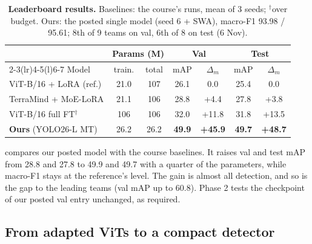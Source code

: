 \begin{table}[t]
  \centering
  \footnotesize
  \setlength{\tabcolsep}{3.4pt}
  \begin{tabular}{@{}lcccccc@{}}
    \toprule
    & \multicolumn{2}{c}{Params (M)} & \multicolumn{2}{c}{Val} & \multicolumn{2}{c}{Test} \\
    \cmidrule(lr){2-3}\cmidrule(lr){4-5}\cmidrule(l){6-7}
    Model & train. & total & mAP & $\Delta_m$ & mAP & $\Delta_m$ \\
    \midrule
    ViT-B/16 + LoRA (ref.)        & 21.0 & 107 & 26.1 & 0.0   & 25.4 & 0.0 \\
    TerraMind + MoE-LoRA          & 21.1 & 106 & 28.8 & +4.4  & 27.8 & +3.8 \\
    ViT-B/16 full FT$^\dagger$    & 106  & 106 & 32.0 & +11.8 & 31.8 & +13.5 \\
    \midrule
    \textbf{Ours} (YOLO26-L MT)   & 26.2 & 26.2 & \textbf{49.9} & \textbf{+45.9} & \textbf{49.7} & \textbf{+48.7} \\
    \bottomrule
  \end{tabular}
  \caption{\textbf{Leaderboard results.} Baselines: the course's runs, mean of 3 seeds; $^\dagger$over budget. Ours: the
  posted single model (seed 6 + SWA), macro-F1 93.98 / 95.61; 8th of 9 teams on val, 6th of 8 on test (6 Nov).}
  \label{tab:main}
\end{table}

 compares our posted model with the course baselines.
It raises val and test mAP from 28.8 and 27.8 to 49.9 and 49.7 with a quarter of the parameters, while macro-F1 stays at
the reference's level.
The gain is almost all detection, and so is the gap to the leading teams (val mAP up to 60.8).
Phase 2 tests the checkpoint of our posted val entry unchanged, as required.

\subsection{From adapted ViTs to a compact detector}
\label{sec:journey}

